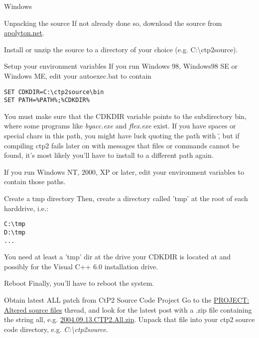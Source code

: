 \begin{section}{Windows}
\begin{subsection}{Unpacking the source}
If not already done so, download the source from \href{http://ctp2files.apolyton.net/source/}{apolyton.net}.

Install or unzip the source to a directory of your choice (e.g. C:\textbackslash{}ctp2source).
\end{subsection}%

\begin{subsection}{Setup your environment variables}
If you run Windows 98, Windows98 SE or Windows ME, edit your autoexec.bat to contain
\begin{verbatim}
SET CDKDIR=C:\ctp2source\bin
SET PATH=%PATH%;%CDKDIR%
\end{verbatim}
You must make sure that the CDKDIR variable points to the subdirectory bin, where some programs like \textit{byacc.exe} and \textit{flex.exe} exist. If you have spaces or special chars in this path, you might have luck quoting the path with \", but if compiling ctp2 fails later on with messages that files or commands cannot be found, it's most likely you'll have to install to a different path again.

If you run Windows NT, 2000, XP or later, edit your environment variables to contain those paths.
\end{subsection}%

\begin{subsection}{Create a tmp directory}
Then, create a directory called 'tmp' at the root of each harddrive, i.e.:
\begin{verbatim}
C:\tmp
D:\tmp
...
\end{verbatim}
You need at least a 'tmp' dir at the drive your CDKDIR is located at and possibly for the Visual C++ 6.0 installation drive.
\end{subsection}%

\begin{subsection}{Reboot}
Finally, you'll have to reboot the system.
\end{subsection}%

\begin{subsection}{Obtain latest ALL patch from CtP2 Source Code Project}
Go to the \href{http://apolyton.net/forums/showthread.php?threadid=100609&goto=lastpost}{PROJECT: Altered source files} thread, and look for the latest post with a .zip file containing the string all, e.g. \href{http://apolyton.net/csd.php?http://apolyton.net/go.php?http://page.mi.fu-berlin.de/~guehmann/CTP2/2004.09.13.CTP2.All.zip}{2004.09.13.CTP2.All.zip}. Unpack that file into your ctp2 source code directory, e.g. \textit{C:\textbackslash{}ctp2source}.
\end{subsection}%


\end{section}
